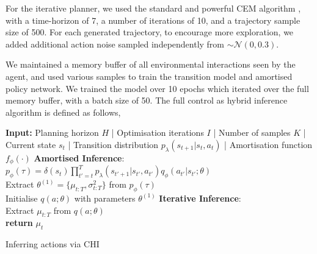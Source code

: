 For the iterative planner, we used the standard and powerful CEM algorithm \citep{de2005tutorial}, with a time-horizon of 7, a number of iterations of 10, and a trajectory sample size of 500. For each generated trajectory, to encourage more exploration, we added additional action noise sampled independently from $\sim \mathcal{N}(0, 0.3)$.

We maintained a memory buffer of all environmental interactions seen by the agent, and used various samples to train the transition model and amortised policy network. We trained the model over 10 epochs which iterated over the full memory buffer, with a batch size of 50. The full control as hybrid inference algorithm is defined as follows,
\newline 

\begin{algorithm}[H]
  \label{algo:chi}
  \SetAlgoLined
     \DontPrintSemicolon
     \textbf{Input:} Planning horizon $H$ | Optimisation iterations $I$ | Number of samples $K$ | Current state $s_t$ |  Transition distribution $p_{\lambda}(s_{t+1}|s_t, a_t)$ | Amortisation function $f_{\phi}(\cdot)$
     \BlankLine
     \textbf{Amortised Inference}: \\
    $p_{\phi}(\tau) = \delta(s_t) \prod_{t'=t}^T p_{\lambda}(s_{t'+1}|s_{t'}, a_{t'}) q_{\phi}(a_{t'}|s_{t'}; \theta)$ \\
     Extract $\theta^{(1)} = \{\mu_{t:T}, \sigma_{t:T}^2 \}$ from $p_{\phi}(\tau) $ \\
     Initialise $q(a; \theta)$ with parameters $\theta^{(1)}$
     \BlankLine
     \textbf{Iterative Inference}: \\
  \BlankLine
  Extract $\mu_{t:T}$ from $q(a; \theta)$ \\
  \textbf{return} $\mu_t$
  \caption{Inferring actions via CHI}
\end{algorithm}


